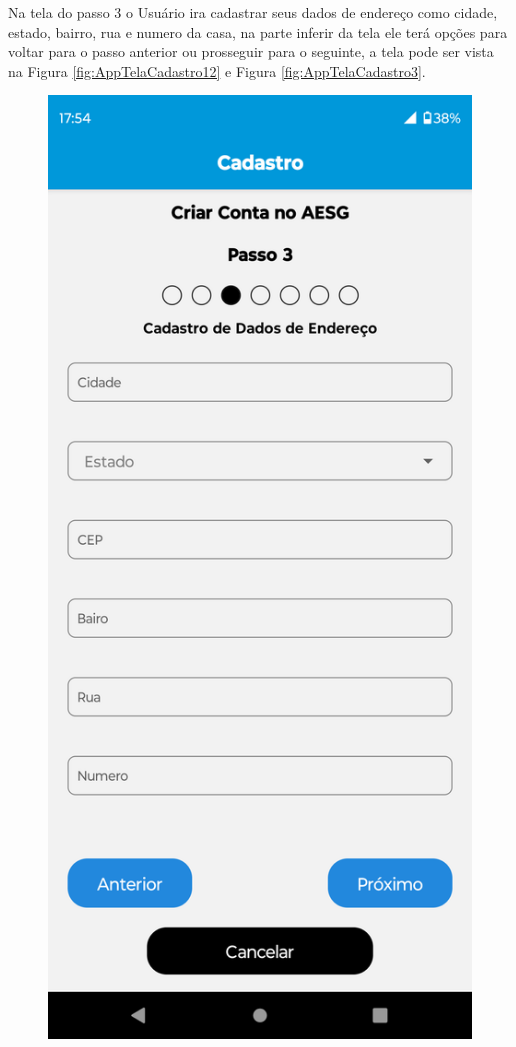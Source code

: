 \documentclass[
    12pt,                   %
    openright,              %
    oneside,                %
    a4paper,                %
    sumario=tradicional,    %
    english,                %
    brazil,                 %
    ]{abntex2}
\begin{document}
            \newpage
            Na tela do passo 3 o Usuário ira cadastrar seus dados de endereço como cidade, estado, bairro, rua e numero  da casa, na parte inferir da tela ele terá opções para voltar para o passo anterior ou prosseguir para o seguinte, a tela pode ser vista na Figura \ref{fig:AppTelaCadastro12} e Figura \ref{fig:AppTelaCadastro3}.
            \begin{figure}[!h]          
                \begin{minipage}{0.5\textwidth}
                    \centering
                    \includegraphics[width=0.8\linewidth]{Imagens/App Images User/AUCadastro12.png}

\end{minipage}
\end{figure}
\end{document}
